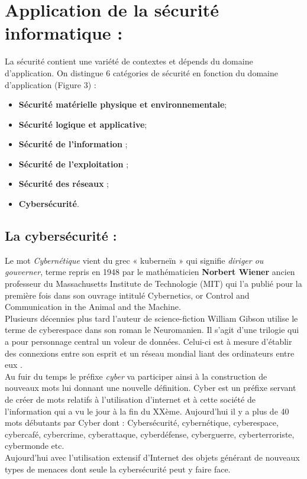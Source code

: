 \section{Application de la sécurité informatique : }
La sécurité contient une variété de contextes et dépends du domaine d’application. On distingue 6 catégories de sécurité en fonction du domaine d’application (Figure 3) :
\begin{itemize}[label=\textbullet]
\item \textbf{Sécurité matérielle physique et environnementale};
\item \textbf{Sécurité logique et applicative};
\item \textbf{Sécurité de l’information} ;
\item \textbf{Sécurité de l’exploitation} ;
\item \textbf{Sécurité des réseaux };
\item \textbf{Cybersécurité}.
\end{itemize}
\newpage
\subsection{La cybersécurité :}
Le mot \emph{Cybernétique} vient du grec « kuberneïn » qui signifie \textit{diriger ou gouverner}, terme repris en 1948 par le mathématicien \textbf{Norbert Wiener} ancien professeur du Massachusetts Institute de Technologie (MIT) qui l’a publié pour la première fois dans son ouvrage intitulé Cybernetics, or Control and Communication in the Animal and the Machine\cite{cybernetics}.\\
Plusieurs décennies plus tard l’auteur de science-fiction William Gibson utilise le terme de cyberespace dans son roman le Neuromanien. Il s’agit d’une trilogie qui a pour personnage central un voleur de données. Celui-ci est à mesure d’établir des connexions entre son esprit et un réseau mondial liant des ordinateurs entre eux \cite{neuromacer}.\\
Au fuir du temps le préfixe \textit{cyber} va participer ainsi à la construction de nouveaux mots lui donnant une nouvelle définition. Cyber est un préfixe servant de créer de mots relatifs à l’utilisation d’internet et à cette société de l’information qui a vu le jour à la fin du XXème. Aujourd’hui il y a plus de 40 mots débutants par Cyber dont : Cybersécurité, cybernétique, cyberespace, cybercafé, cybercrime, cyberattaque, cyberdéfense, cyberguerre, cyberterroriste, cybermonde etc.\\
Aujourd’hui avec l’utilisation extensif d’Internet des objets générant de nouveaux types de menaces dont seule la cybersécurité peut y faire face.\\

